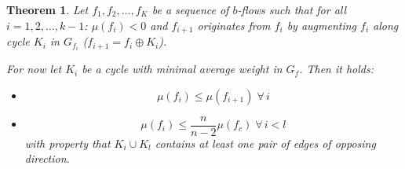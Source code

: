 \documentclass{article}
\newtheorem{theorem}{Theorem}
\newcommand{\fall}{\;\forall\,}
\begin{document}
\begin{theorem}\label{lemma-5.5}
  Let $f_1, f_2, \ldots, f_K$ be a sequence of $b$-flows such that for all $i = 1, 2, \ldots, k-1$:
  $\mu(f_i) < 0$  and $f_{i+1}$ originates from $f_i$ by augmenting $f_i$ along cycle $K_i$ in $G_{f_i}$ ($f_{i+1} = f_i \oplus K_i$).

  For now let $K_i$ be a cycle with minimal average weight in $G_f$. Then it holds:
  \begin{itemize}
    \item \[ \mu(f_i) \leq \mu(f_{i+1}) \fall i \]
    \item \[ \mu(f_i) \leq \frac{n}{n-2} \mu(f_c) \fall i < l \]
      with property that $K_i \cup K_l$ contains at least one pair of edges of opposing direction.
  \end{itemize}
\end{theorem}
\end{document}
